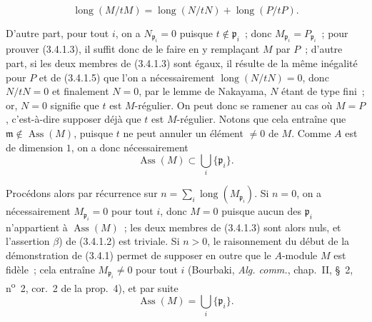\begin{env}[3.4.1.5]
\label{IV.2.3.4.1.5-fr}
\[
\operatorname{long}(M/tM)
=\operatorname{long}(N/tN)+\operatorname{long}(P/tP).
\]
\end{env}

D'autre part, pour tout $i$, on a $N_{\mathfrak p_i}=0$ puisque
$t\notin\mathfrak p_i$~; donc $M_{\mathfrak p_i}=P_{\mathfrak p_i}$~; pour
prouver (3.4.1.3), il suffit donc de le faire en y remplaçant $M$ par $P$~;
d'autre part, si les deux membres de (3.4.1.3) sont égaux, il résulte de la
même inégalité pour $P$ et de (3.4.1.5) que l'on a nécessairement
$\operatorname{long}(N/tN)=0$, donc $N/tN=0$ et finalement $N=0$, par le lemme
de Nakayama, $N$ étant de type fini~; or, $N=0$ signifie que $t$ est
$M$-régulier. On peut donc se ramener au cas où $M=P$, c'est-à-dire supposer
déjà que $t$ est $M$-régulier. Notons que cela entraîne que
$\mathfrak m\notin\operatorname{Ass}(M)$, puisque $t$ ne peut annuler un
élément $\neq0$ de $M$. Comme $A$ est de dimension $1$, on a donc
nécessairement
\[
\operatorname{Ass}(M)\subset\bigcup_i\{\mathfrak p_i\}.
\]

Procédons alors par récurrence sur
$n=\sum_i\operatorname{long}(M_{\mathfrak p_i})$. Si $n=0$, on a
nécessairement $M_{\mathfrak p_i}=0$ pour tout $i$, donc $M=0$ puisque aucun
des $\mathfrak p_i$ n'appartient à $\operatorname{Ass}(M)$~; les deux membres
de (3.4.1.3) sont alors nuls, et l'assertion $\beta$) de (3.4.1.2) est
triviale. Si $n>0$, le raisonnement du début de la démonstration de (3.4.1)
permet de supposer en outre que le $A$-module $M$ est fidèle~; cela entraîne
$M_{\mathfrak p_i}\neq0$ pour tout $i$ (Bourbaki, \emph{Alg. comm.}, chap.~II,
\S~2, n\textsuperscript{o}~2, cor.~2 de la prop.~4), et par suite
\[
\operatorname{Ass}(M)=\bigcup_i\{\mathfrak p_i\}.
\]


